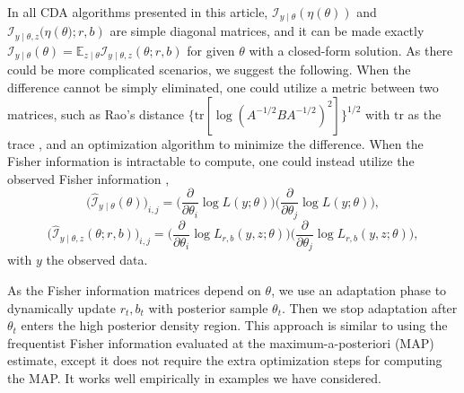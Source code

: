 \documentclass[12pt]{article}
\newcommand{\bb}[1]{\mathbb{#1}}
\newcommand{\mc}[1]{\mathcal{#1}}
\begin{document}
{
In all CDA algorithms presented in
this article,  $\mc I_{y\mid \theta}(\eta({\theta}))$  and  $\mc I_{y\mid \theta,z}(\eta({\theta)};r,b)$ are simple diagonal matrices, and 
 it can be made exactly $\mc I_{y\mid \theta}({\theta})=\bb E_{z\mid \theta}\mc I_{y\mid \theta,z}({\theta};r,b)$ for given $\theta$ with a closed-form
solution. As there could be more complicated
scenarios, we suggest the following. When the difference cannot
be simply eliminated, one could utilize a metric between two matrices, such
as Rao's distance $\{\text{tr}
[\log(A^{-1/2}BA^{-1/2})^{2}]\}^{1/2}$ with $\text{tr}$ as the trace \citep{atkinson1981rao},
and an optimization algorithm to minimize the difference. When the Fisher information
is intractable to compute, one could instead utilize the observed Fisher information
\citep{efron1978assessing},    
$$\bigg(\hat{\mc I}_{y\mid \theta}({\theta}) \bigg)_{i,j}   =  \bigg( \frac{\partial}{\partial \theta_i} \log L(y;\theta) \bigg) \bigg( \frac{\partial}{\partial \theta_j} \log L(y;\theta) \bigg),$$ 
$$ \bigg(  \hat{\mc I}_{y\mid \theta,z}({\theta};r,b) \bigg)_{i,j} = \bigg( \frac{\partial}{\partial \theta_i} \log L_{r,b}(y,z;\theta) \bigg)\bigg( \frac{\partial}{\partial \theta_j} \log L_{r,b}(y,z;\theta) \bigg),$$
with $y$ the observed data.
}


{As the Fisher information matrices depend on $\theta$, we use  an adaptation phase to dynamically update $r_t,b_t$ with posterior sample $\theta_t$. Then
we stop adaptation after $\theta_t$ enters the high posterior
density region. This approach is similar to using the frequentist Fisher information evaluated at the maximum-a-posteriori
(MAP) estimate, except it does not require the extra optimization steps  for computing
the MAP. It works well empirically in examples we have considered.}
\end{document}
